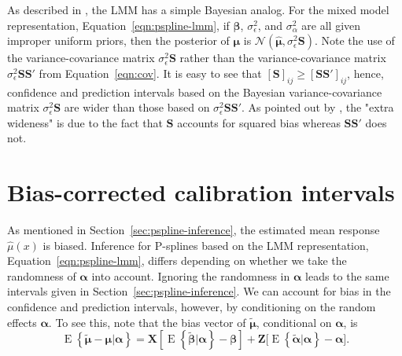 \documentclass[cmfont,usenames,dvipsnames,leqno]{afit-etd}\usepackage[]{graphicx}\usepackage[]{color}
\newcommand{\mc}[1]{\ensuremath{\mathcal{#1}}}
\newcommand{\wh}[1]{\ensuremath{\widehat{#1}}}
\newcommand{\wt}[1]{\ensuremath{\widetilde{#1}}}
\newcommand{\E}{\operatorname{E}}
\begin{document}
As described in \citet{robinson_that_1991}, the \ac{LMM} has a simple Bayesian analog. For the mixed model representation, Equation~\eqref{eqn:pspline-lmm}, if $\bm{\beta}$, $\sigma_\epsilon^2$, and $\sigma_\alpha^2$ are all given improper uniform priors, then the posterior of $\bm{\mu}$ is $\mc{N}\left( \wh{\bm{\mu}}, \sigma_\epsilon^2 \bm{S} \right)$. Note the use of the variance-covariance matrix $\sigma_\epsilon^2\bm{S}$ rather than the variance-covariance matrix $\sigma_\epsilon^2\bm{S}\bm{S}'$ from Equation~\eqref{eqn:cov}. It is easy to see that $\left[\bm{S}\right]_{ij} \ge \left[\bm{S}\bm{S}'\right]_{ij}$, hence, confidence and prediction intervals based on the Bayesian variance-covariance matrix $\sigma_\epsilon^2\bm{S}$ are wider than those based on $\sigma_\epsilon^2\bm{S}\bm{S}'$. As pointed out by \citet{hastie_gams_1990}, the "extra wideness" is due to the fact that $\bm{S}$ accounts for squared bias whereas $\bm{S}\bm{S}'$ does not.

\section{Bias-corrected calibration intervals}
\label{sec:adjusted-calibration}
As mentioned in Section~\ref{sec:pspline-inference}, the estimated mean response $\wh{\mu}(x)$ is biased. Inference for \ac{P-spline}s based on the \ac{LMM} representation, Equation~\eqref{eqn:pspline-lmm}, differs depending on whether we take the randomness of $\bm{\alpha}$ into account. Ignoring the randomness in $\bm{\alpha}$ leads to the same intervals given in Section~\ref{sec:pspline-inference}. We can account for bias in the confidence and prediction intervals, however, by conditioning on the random effects $\bm{\alpha}$. To see this, note that the bias vector of $\wt{\bm{\mu}}$, conditional on $\bm{\alpha}$, is 
\begin{equation}
\label{eqn:conditional-bias}
  \E\left\{\wt{\bm{\mu}} - \bm{\mu} | \bm{\alpha}\right\} = \bm{X}\left[ \E\left\{\wt{\bm{\beta}} | \bm{\alpha}\right\} - \bm{\beta} \right] + \bm{Z}\Big[ \E\left\{\wt{\bm{\alpha}} | \bm{\alpha}\right\} - \bm{\alpha} \Big].
\end{equation}
\end{document}
